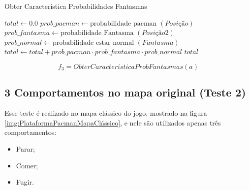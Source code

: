 \begin{algorithm}[H]
	\caption{Obter Característica Probabilidades Fantasmas} \label{algorithm:ObterCaracteristicaProbabilidadesFantasmas}
	\begin{algorithmic}[1]
			\State $\textit{total} \gets 0.0 $
						\State $\textit{prob\_pacman} \gets \text{probabilidade pacman } \left( \textit{Posição} \right) $
							\State $\textit{prob\_fantasma} \gets \text{probabilidade Fantasma } \left( \textit{Posição2} \right) $
							\State $\textit{prob\_normal} \gets \text{probabilidade estar normal } \left( \textit{Fantasma} \right) $
							\State $\textit{total} \gets \textit{total} + \textit{prob\_pacman}  \cdot \textit{prob\_fantasma} \cdot \textit{prob\_normal} $
						\EndFor
					\EndIf
				\EndFor
			\EndFor
			\State \Return $ \textit{total} $
		\EndProcedure
	\end{algorithmic}
\end{algorithm}

$$ f_3 = ObterCaracteristicaProbFantasmas \left( a \right) $$


\subsection{3 Comportamentos no mapa original (Teste 2)} \label{subsection:3ComportamentosMapaOriginal}

Esse teste é realizado no mapa clássico do jogo, mostrado na figura \ref{img:PlataformaPacmanMapaClássico}, e nele são utilizados apenas três comportamentos:

\begin{itemize}
	\item Parar;
	\item Comer;
	\item Fugir.
\end{itemize}

